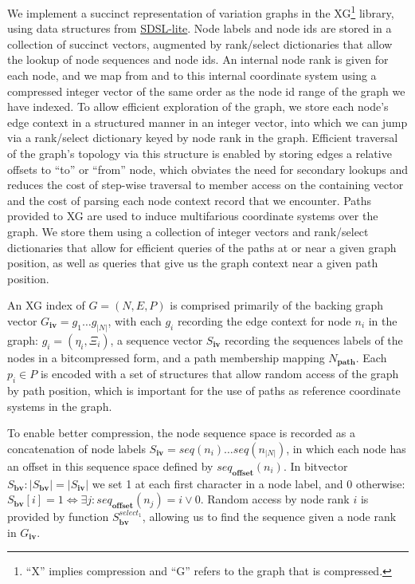 We implement a succinct representation of variation graphs in the XG\footnote{``X'' implies compression and ``G'' refers to the graph that is compressed.} library, using data structures from \href{https://github.com/simongog/sdsl-lite}{SDSL-lite}.
Node labels and node ids are stored in a collection of succinct vectors, augmented by rank/select dictionaries that allow the lookup of node sequences and node ids.
An internal node rank is given for each node, and we map from and to this internal coordinate system using a compressed integer vector of the same order as the node id range of the graph we have indexed.
To allow efficient exploration of the graph, we store each node's edge context in a structured manner in an integer vector, into which we can jump via a rank/select dictionary keyed by node rank in the graph.
Efficient traversal of the graph's topology via this structure is enabled by storing edges a relative offsets to ``to'' or ``from'' node, which obviates the need for secondary lookups and reduces the cost of step-wise traversal to member access on the containing vector and the cost of parsing each node context record that we encounter.
Paths provided to XG are used to induce multifarious coordinate systems over the graph. 
We store them using a collection of integer vectors and rank/select dictionaries that allow for efficient queries of the paths at or near a given graph position, as well as queries that give us the graph context near a given path position.

An XG index of $G = (N, E, P)$ is comprised primarily of the backing graph vector $G_\textbf{iv} = g_1 \ldots g_{|N|}$, with each $g_i$ recording the edge context for node $n_i$ in the graph: $g_i = ( \eta_i, \Xi_i)$, a sequence vector $S_\textbf{iv}$ recording the sequences labels of the nodes in a bitcompressed form, and a path membership mapping $N_\textbf{path}$.
Each $p_i \in P$ is encoded with a set of structures that allow random access of the graph by path position, which is important for the use of paths as reference coordinate systems in the graph.

To enable better compression, the node sequence space is recorded as a concatenation of node labels $S_\textbf{iv} = seq(n_i) \ldots seq(n_{|N|})$, in which each node has an offset in this sequence space defined by $seq_\textbf{offset}(n_i)$.
In bitvector $S_\textbf{bv} : |S_\textbf{bv}| = |S_\textbf{iv}|$ we set 1 at each first character in a node label, and 0 otherwise: $S_\textbf{bv}[i] = 1 \iff \exists j : seq_\textbf{offset}(n_j) = i \lor 0$.
Random access by node rank $i$ is provided by function $S_\textbf{bv}^{select_1}$, allowing us to find the sequence given a node rank in $G_\textbf{iv}$.

